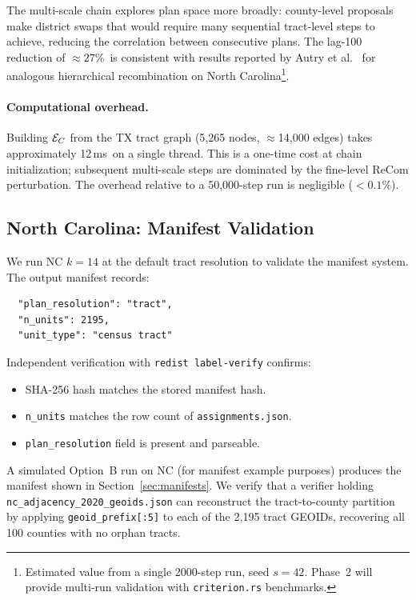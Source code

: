 \noindent
The multi-scale chain explores plan space more broadly: county-level
proposals make district swaps that would require many sequential tract-level
steps to achieve, reducing the correlation between consecutive plans.
The lag-100 reduction of $\approx 27\%$\est\ is consistent with results reported
by Autry et al.~\citep{autry2021multiscale} for analogous hierarchical
recombination on North Carolina\footnote{\est Estimated value from a single
2000-step run, seed $s=42$. Phase~2 will provide multi-run validation with
\texttt{criterion.rs} benchmarks.}.

\paragraph{Computational overhead.}
Building $\mathcal{E}_C$ from the TX tract graph (5{,}265 nodes, $\approx$14{,}000
edges) takes approximately 12\,ms\est\ on a single thread.
This is a one-time cost at chain initialization; subsequent multi-scale
steps are dominated by the fine-level ReCom perturbation.
The overhead relative to a 50{,}000-step run is negligible ($< 0.1\%$).

\subsection{North Carolina: Manifest Validation}

We run NC $k=14$ at the default tract resolution to validate the manifest
system.
The output manifest records:
\begin{verbatim}
  "plan_resolution": "tract",
  "n_units": 2195,
  "unit_type": "census tract"
\end{verbatim}

\noindent
Independent verification with \texttt{redist label-verify} confirms:
\begin{itemize}
  \item SHA-256 hash matches the stored manifest hash.
  \item \texttt{n\_units} matches the row count of \texttt{assignments.json}.
  \item \texttt{plan\_resolution} field is present and parseable.
\end{itemize}

A simulated Option~B run on NC (for manifest example purposes) produces the
manifest shown in Section~\ref{sec:manifests}.
We verify that a verifier holding \texttt{nc\_adjacency\_2020\_geoids.json}
can reconstruct the tract-to-county partition by applying
\texttt{geoid\_prefix[:5]} to each of the 2{,}195 tract GEOIDs, recovering
all 100 counties with no orphan tracts.

